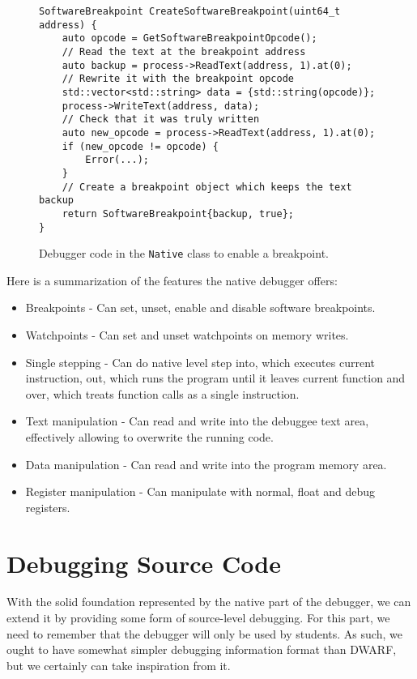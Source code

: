\begin{figure}
    \begin{verbatim}
SoftwareBreakpoint CreateSoftwareBreakpoint(uint64_t address) {
    auto opcode = GetSoftwareBreakpointOpcode();
    // Read the text at the breakpoint address
    auto backup = process->ReadText(address, 1).at(0);
    // Rewrite it with the breakpoint opcode
    std::vector<std::string> data = {std::string(opcode)};
    process->WriteText(address, data);
    // Check that it was truly written
    auto new_opcode = process->ReadText(address, 1).at(0);
    if (new_opcode != opcode) {
        Error(...);
    }
    // Create a breakpoint object which keeps the text backup
    return SoftwareBreakpoint{backup, true};
}
    \end{verbatim}
    \caption{Debugger code in the \texttt{Native} class to enable a breakpoint.}
    \label{t86dbg:breakpoint}
\end{figure}

Here is a summarization of the features the native debugger offers:
\begin{itemize}
    \item Breakpoints - Can set, unset, enable and disable software breakpoints.
    \item Watchpoints - Can set and unset watchpoints on memory writes.
    \item Single stepping - Can do native level step into, which executes
        current instruction, out, which runs the program until it leaves
        current function and over, which treats function calls as a single
        instruction.
    \item Text manipulation - Can read and write into the debuggee text area,
        effectively allowing to overwrite the running code.
    \item Data manipulation - Can read and write into the program memory area.
    \item Register manipulation - Can manipulate with normal, float and debug registers.
\end{itemize}

\section{Debugging Source Code}\label{section:source-debugger}
With the solid foundation represented by the native part of the debugger, we
can extend it by providing some form of source-level debugging. For this part,
we need to remember that the debugger will only be used by students. As such,
we ought to have somewhat simpler debugging information format than DWARF, but
we certainly can take inspiration from it.

